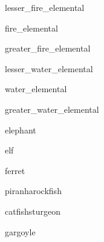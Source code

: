 \documentclass[a4paper,serif]{module}
\begin{document}
\begin{newmonster}{lesser_fire_elemental}\end{newmonster}

\begin{newmonster}{fire_elemental}\end{newmonster}

\begin{newmonster}{greater_fire_elemental}\end{newmonster}

\begin{newmonster}{lesser_water_elemental}\end{newmonster}

\begin{newmonster}{water_elemental}\end{newmonster}

\begin{newmonster}{greater_water_elemental}\end{newmonster}

\begin{newmonster}{elephant}\end{newmonster}

\begin{newmonster}{elf}\end{newmonster}

\begin{newmonster}{ferret}\end{newmonster}


\begin{newmonster2}{piranha}{rockfish}\end{newmonster2}
\begin{newmonster2*}{catfish}{sturgeon}{}{}\end{newmonster2*}

\begin{newmonster}{gargoyle}\end{newmonster}
\end{document}

